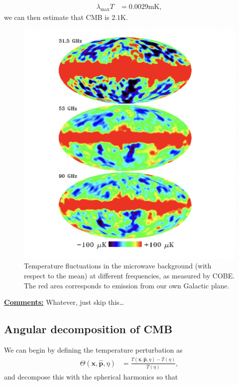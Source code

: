 \documentclass[a4paper, 12pt]{article}
\begin{document}
{{          \begin{align}
            \label{wien's law}
            \lambda_{\mathrm{max}} T &= 0.0029 \mathrm{mK}, 
          \end{align} we can then estimate that CMB is \( 2.1
          \mathrm{K} \).


      \begin{figure}[h!]
      \begin{center}
        \includegraphics[scale=0.5]{Figures/cobecmb.png}
      \end{center}
      \caption{Temperature fluctuations in the microwave
        background (with respect to the mean) at different
        frequencies, as measured by COBE. The red area
        corresponds to emission from our own Galactic plane.}
      \label{fig:cobecmb}
      \end{figure}
      

      \textbf{\underline{Comments:}} Whatever, just skip this\ldots


      \subsection{Angular decomposition of CMB}%
        \label{sub:Angular decomposition of CMB}
        We can begin by defining the temperature perturbation as 
        \begin{align}
          \label{temperature peturbations}
          \Theta(\textbf{x}, \hat{\textbf{p}}, \eta) &=
          \frac{T(\textbf{x}, \hat{\textbf{p}}, \eta) -
          \bar{T}(\eta)}{\bar{T}(\eta)},
        \end{align} and decompose this with the spherical
        harmonics so that 

}}
\end{document}
